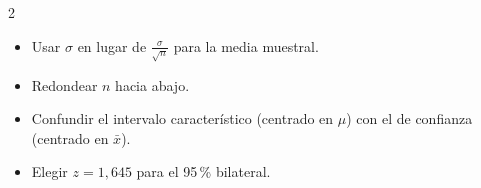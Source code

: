 \documentclass[10pt]{article}
\begin{document}
\begin{multicols}{2}
\begin{ojo}
\begin{itemize}
  \item Usar \(\sigma\) en lugar de \(\frac\sigma{\sqrt n}\) para la media muestral.
  \item Redondear \(n\) hacia abajo.
  \item Confundir el intervalo característico (centrado en \(\mu\)) con el de confianza (centrado en \(\bar x\)).
  \item Elegir \(z=1{,}645\) para el 95\,\% bilateral.
\end{itemize}
\end{ojo}

\end{multicols}
\end{document}
